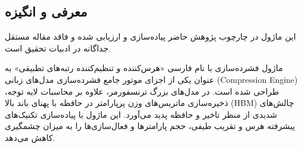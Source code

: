 \subsection{معرفی و انگیزه}
این ماژول در چارچوب پژوهش حاضر پیاده‌سازی و ارزیابی شده و فاقد مقاله مستقل جداگانه در ادبیات تحقیق است.

ماژول فشرده‌سازی  با نام فارسی «هرس‌کننده و تنظیم‌کننده رتبه‌های تطبیقی» به عنوان یکی از اجزای موتور جامع فشرده‌سازی مدل‌های زبانی (Compression Engine) طراحی شده است. در مدل‌های بزرگ ترنسفورمر، علاوه بر محاسبات لایه توجه، ذخیره‌سازی ماتریس‌های وزن پرپارامتر در حافظه با پهنای باند بالا (HBM) چالش‌های شدیدی از منظر تاخیر و حافظه پدید می‌آورد. این ماژول با پیاده‌سازی تکنیک‌های پیشرفته هرس و تقریب طیفی، حجم پارامترها و فعال‌سازی‌ها را به میزان چشمگیری کاهش می‌دهد.
